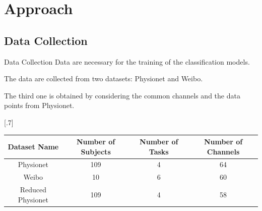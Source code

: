\section{Approach}

\subsection*{Data Collection}
\begin{frame}{Data Collection}
    Data are necessary for the training of the classification models. 
    
    \vspace*{.5cm}
    The data are collected from two datasets: Physionet and Weibo.
    
    \vspace*{.5cm}
    The third one is obtained by considering the common channels and the data points from Physionet.
    \begin{table}[!htbp] 
        \centering 
        \scalebox{.7}[.7]{
            \begin{tabular}{|c|c|c|c|} 
                \hline 
                \textbf{Dataset Name} & \textbf{Number of
    Subjects} & \textbf{Number of Tasks} & \textbf{Number of Channels}\\
                \hline
                \hline 
                Physionet & 109 & 4 & 64\\ 
                \hline 
                Weibo & 10 & 6 & 60\\ 
                \hline 
                \hline
                Reduced Physionet & 109 & 4 & 58\\
                \hline 
            \end{tabular} 
        }
    \end{table}
\end{frame}

